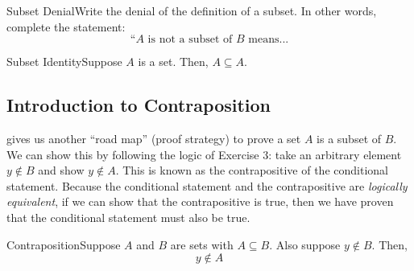 \begin{exercise}
    {Subset Denial}Write the denial of the definition of a subset. In other words, complete the statement: $$\text{``}A \text{ is not a subset of $B$ means...}$$
\end{exercise}



\begin{exercise}
    {Subset Identity}Suppose $A$ is a set. Then, $A\subseteq A$.
\end{exercise}




\subsection{Introduction to Contraposition}

 gives us another ``road map'' (proof strategy) to prove a set $A$ is a subset of $B$. We can show this by following the logic of Exercise 3: take an arbitrary element $y \notin B$ and show $y \notin A$. This is known as the contrapositive of the conditional statement. Because the conditional statement and the contrapositive are \textit{logically equivalent}, if we can show that the contrapositive is true, then we have proven that the conditional statement must also be true.

\begin{exercise}
    {Contraposition}Suppose $A$ and $B$ are sets with $A\subseteq B$. Also suppose $y\notin B$. Then, $$y\notin A$$
\end{exercise}


